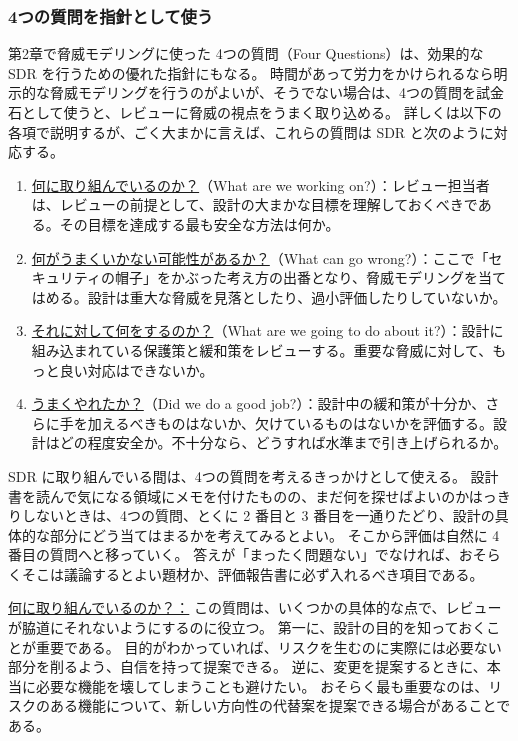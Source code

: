 \documentclass[uplatex]{jsarticle}
\def\label#1{}%
\begin{document}
\subsubsection{4つの質問を指針として使う}

第2章で脅威モデリングに使った 4つの質問（Four Questions）は、効果的な SDR を行うための優れた指針にもなる。
時間があって労力をかけられるなら明示的な脅威モデリングを行うのがよいが、そうでない場合は、4つの質問を試金石として使うと、レビューに脅威の視点をうまく取り込める。
詳しくは以下の各項で説明するが、ごく大まかに言えば、これらの質問は SDR と次のように対応する。

\begin{dfn}\label{dfn:ch7-four-questions}
\begin{enumerate}
\item \underline{何に取り組んでいるのか？}（What are we working on?）：レビュー担当者は、レビューの前提として、設計の大まかな目標を理解しておくべきである。その目標を達成する最も安全な方法は何か。
\item \underline{何がうまくいかない可能性があるか？}（What can go wrong?）：ここで「セキュリティの帽子」をかぶった考え方の出番となり、脅威モデリングを当てはめる。設計は重大な脅威を見落としたり、過小評価したりしていないか。
\item \underline{それに対して何をするのか？}（What are we going to do about it?）：設計に組み込まれている保護策と緩和策をレビューする。重要な脅威に対して、もっと良い対応はできないか。
\item \underline{うまくやれたか？}（Did we do a good job?）：設計中の緩和策が十分か、さらに手を加えるべきものはないか、欠けているものはないかを評価する。設計はどの程度安全か。不十分なら、どうすれば水準まで引き上げられるか。
\end{enumerate}
\end{dfn}

SDR に取り組んでいる間は、4つの質問を考えるきっかけとして使える。
設計書を読んで気になる領域にメモを付けたものの、まだ何を探せばよいのかはっきりしないときは、4つの質問、とくに 2 番目と 3 番目を一通りたどり、設計の具体的な部分にどう当てはまるかを考えてみるとよい。
そこから評価は自然に 4 番目の質問へと移っていく。
答えが「まったく問題ない」でなければ、おそらくそこは議論するとよい題材か、評価報告書に必ず入れるべき項目である。

\underline{何に取り組んでいるのか？：}
この質問は、いくつかの具体的な点で、レビューが脇道にそれないようにするのに役立つ。
第一に、設計の目的を知っておくことが重要である。
目的がわかっていれば、リスクを生むのに実際には必要ない部分を削るよう、自信を持って提案できる。
逆に、変更を提案するときに、本当に必要な機能を壊してしまうことも避けたい。
おそらく最も重要なのは、リスクのある機能について、新しい方向性の代替案を提案できる場合があることである。
\end{document}
